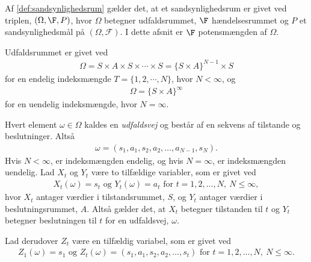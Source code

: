 Af \autoref{def:sandsynlighedsrum} gælder det, at et sandsynlighedsrum er givet ved triplen, $(\Omega, \F, P)$, hvor $\Omega$ betegner udfaldsrummet, $\F$ hændelsesrummet og $P$ et sandsynlighedsmål på $(\Omega,\mathcal{F})$. I dette afsnit er $\F$ potensmængden af $\Omega$.

Udfaldsrummet er givet ved
\begin{align*}
    \Omega = S \times A \times S \times \cdots \times S = \{S \times A\}^{N-1} \times S
\end{align*}
for en endelig indeksmængde $T=\{1, 2,\cdots, N\}$, hvor $N<\infty$, og
\begin{align*}
    \Omega = \{S \times A\}^\infty
\end{align*}
for en uendelig indeksmængde, hvor $N=\infty$.

Hvert element $\omega \in \Omega$ kaldes en \textit{udfaldsvej} og består af en sekvens af tilstande og beslutninger. Altså
\begin{align*}
    \omega=(s_1 , a_1 , s_2 , a_2 , \dots , a_{N-1} , s_N).
\end{align*}
Hvis $N<\infty$, er indeksmængden endelig, og hvis $N=\infty$, er indeksmængden uendelig. 
Lad $X_t$ og $Y_t$ være to tilfældige variabler, som er givet ved
\begin{align*}
    X_t(\omega) = s_t \text{ og } Y_t(\omega) = a_t \text{ for } t=1,2,\dots, N, \  N\leq \infty,
\end{align*}
hvor $X_t$ antager værdier i tilstandsrummet, $S$, og $Y_t$ antager værdier i beslutningsrummet, $A$. Altså gælder det, at $X_t$ betegner tilstanden til $t$ og $Y_t$ betegner beslutningen til $t$ for en udfaldsvej, $\omega$.

Lad derudover $Z_t$ være en tilfældig variabel, som er givet ved
\begin{align*}
    Z_1(\omega) = s_1 \text{ og } Z_t(\omega) = (s_1 , a_1 , s_2 , a_2 , \dots , s_t) \text{ for } t=1,2, \dots, N, \  N\leq \infty.
\end{align*}

